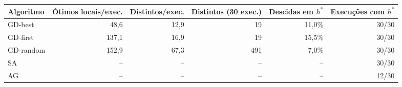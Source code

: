 \begin{tabular}{lrrrrr}
\toprule
Algoritmo & Ótimos locais/exec. & Distintos/exec. & Distintos (30 exec.) & Descidas em $h^*$ & Execuções com $h^*$ \\
\midrule
GD-best & 48,6 & 12,9 & 19 & 11,0\% & 30/30 \\
GD-first & 137,1 & 16,9 & 19 & 15,5\% & 30/30 \\
GD-random & 152,9 & 67,3 & 491 & 7,0\% & 30/30 \\
SA & -- & -- & -- & -- & 30/30 \\
AG & -- & -- & -- & -- & 12/30 \\
\bottomrule
\end{tabular}
